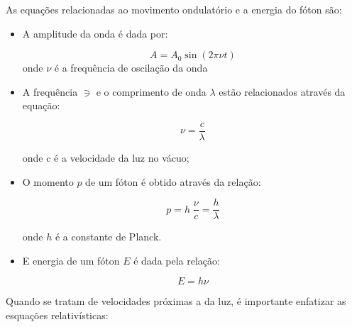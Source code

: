 \documentclass[11pt,a4paper]{article}
\begin{document}
            As equações relacionadas ao movimento ondulatório e a energia do fóton são:

            \begin{itemize}
                \item A amplitude da onda é dada por:
                
                    \begin{equation}
                        A = A_0 \sin (2 \pi \nu t)
                    \end{equation}
                    \noindent onde $\nu$ é a frequência de oscilação da onda
                
                \item A frequência $\ni$ e o comprimento de onda $\lambda$ estão relacionados através da equação:
                    
                    \begin{equation}
                        \nu = \frac{c}{\lambda}
                    \end{equation}

                    \noindent onde c é a velocidade da luz no vácuo;

                \item O momento $p$ de um fóton é obtido através da relação:
                
                    \begin{equation}
                        p = h \; \frac{\nu}{c} = \frac{h}{\lambda}
                    \end{equation}

                    \noindent onde $h$ é a constante de Planck.

                \item E energia de um fóton $E$ é dada pela relação:
                
                    \begin{equation}
                        E = h \nu
                    \end{equation}

            \end{itemize}

            Quando se tratam de velocidades próximas a da luz, é importante enfatizar as esquações relativísticas:
\end{document}
